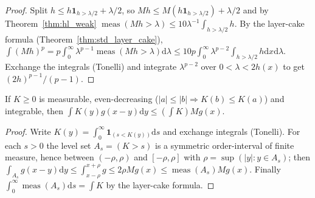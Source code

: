 \begin{proof}
\leanok
Split $h \le h \mathbf 1_{h > \lambda/2} + \lambda/2$, so $M h \le M(h \mathbf 1_{h > \lambda/2}) + \lambda/2$ and by Theorem~\ref{thm:hl_weak} $\operatorname{meas}(M h > \lambda) \le 10 \lambda^{-1} \int_{h > \lambda/2} h$. By the layer-cake formula (Theorem~\ref{thm:std_layer_cake}), $\int (M h)^p = p \int_0^\infty \lambda^{p-1} \operatorname{meas}(M h > \lambda) \mathrm{d}\lambda \le 10 p \int_0^\infty \lambda^{p-2} \int_{h > \lambda/2} h  \mathrm{d}x \mathrm{d}\lambda$. Exchange the integrals (Tonelli) and integrate $\lambda^{p-2}$ over $0 < \lambda < 2h(x)$ to get $(2h)^{p-1}/(p-1)$.
\end{proof}

\begin{theorem}\label{thm:hl_domination}
\leanok
If $K \ge 0$ is measurable, even-decreasing ($\lvert a \rvert \le \lvert b \rvert \Rightarrow K(b) \le K(a)$) and integrable, then $\int K(y) g(x - y) \mathrm{d}y \le (\int K) M g(x)$.
\end{theorem}

\begin{proof}
\leanok
Write $K(y) = \int_0^\infty \mathbf 1_{(s < K(y))} \mathrm{d}s$ and exchange integrals (Tonelli). For each $s > 0$ the level set $A_s = (K > s)$ is a symmetric order-interval of finite measure, hence between $(-\rho, \rho)$ and $[-\rho, \rho]$ with $\rho = \sup(\lvert y \rvert : y \in A_s)$; then $\int_{A_s} g(x-y) \mathrm{d}y \le \int_{x-\rho}^{x+\rho} g \le 2\rho M g(x) \le \operatorname{meas}(A_s) M g(x)$. Finally $\int_0^\infty \operatorname{meas}(A_s) \mathrm{d}s = \int K$ by the layer-cake formula.
\end{proof}
